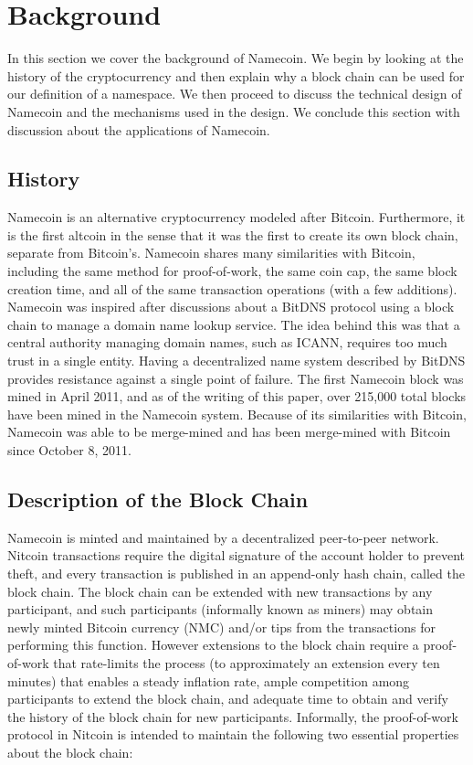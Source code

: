 \section{Background}
\label{sec:background}

In this section we cover the background of Namecoin. We begin by looking at the history of the cryptocurrency and then explain why a block chain can be used for our definition of a namespace. We then proceed to discuss the technical design of Namecoin and the mechanisms used in the design. We conclude this section with discussion about the applications of Namecoin.

\subsection{History}

Namecoin is an alternative cryptocurrency modeled after Bitcoin\cite{nakamoto2008bitcoin}. Furthermore, it is the first altcoin in the sense that it was the first to create its own block chain, separate from Bitcoin's.  Namecoin shares many similarities with Bitcoin, including the same method for proof-of-work, the same coin cap, the same block creation time, and all of the same transaction operations (with a few additions). Namecoin was inspired after discussions about a BitDNS\cite{bitdns} protocol using a block chain to manage a domain name lookup service. The idea behind this was that a central authority managing domain names, such as ICANN, requires too much trust in a single entity. Having a decentralized name system described by BitDNS provides resistance against a single point of failure. The first Namecoin block was mined in April 2011, and as of the writing of this paper, over 215,000 total blocks have been mined in the Namecoin system. Because of its similarities with Bitcoin, Namecoin was able to be merge-mined and has been merge-mined with Bitcoin since October 8, 2011. 

\subsection{Description of the Block Chain}

Namecoin is minted and maintained by a decentralized peer-to-peer network. Nitcoin transactions require the digital signature of the account holder to prevent theft, and every transaction is published in an append-only hash chain, called the block chain. The block chain can be extended with new transactions by any participant, and such participants (informally known as miners) may obtain newly minted Bitcoin currency (NMC) and/or tips from the transactions for performing this function. However extensions to the block chain require a proof-of-work that rate-limits the process (to approximately an extension every ten minutes) that enables a steady inflation rate, ample competition among participants to extend the block chain, and adequate time to obtain and verify the history of the block chain for new participants. Informally, the proof-of-work protocol in Nitcoin is intended to maintain the following two essential properties about the block chain:

